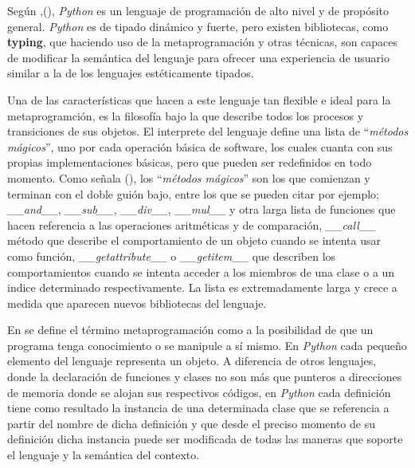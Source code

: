 Según ,(\cite{python}), {\it Python} es un lenguaje de programación de alto nivel y de propósito general.
    {\it Python} es de tipado dinámico y fuerte, pero existen bibliotecas, como {\bf typing}, que haciendo
uso de la metaprogramación y otras técnicas, son capaces de modificar la semántica del
lenguaje para ofrecer una experiencia de usuario similar a la de los lenguajes estéticamente
tipados.

Una de las características que hacen a este lenguaje tan flexible e ideal para la metaprogramción,
es la filosofía bajo la que describe todos los procesos y transiciones de sus objetos. El
interprete del lenguaje define una lista de ``{\it métodos mágicos}'', uno por cada operación básica
de software, los cuales cuanta con sus propias implementaciones básicas, pero que pueden ser
redefinidos en todo momento. Como señala (\cite{python}), los ``{\it métodos mágicos}'' son los que comienzan y
terminan con el doble guión bajo, entre los que se pueden citar por ejemplo;
{\it \_\_and\_\_}, {\it \_\_sub\_\_}, {\it \_\_div\_\_}, {\it \_\_mul\_\_} y otra larga lista de funciones que hacen referencia
a las operaciones aritméticas y de comparación, {\it\_\_call\_\_} método que describe el comportamiento
de un objeto cuando se intenta usar como función, {\it \_\_getattribute\_\_} o {\it \_\_getitem\_\_}
que describen los comportamientos cuando se intenta acceder a los miembros de una clase o a
un indice determinado respectivamente. La lista es extremadamente larga y crece a medida
que aparecen nuevos bibliotecas del lenguaje.

En \cite{python} se define el término metaprogramación como a la posibilidad de que un programa tenga
conocimiento o se manipule a sí mismo. En {\it Python} cada pequeño elemento del lenguaje
representa un objeto. A diferencia de otros lenguajes, donde la declaración de funciones y
clases no son más que punteros a direcciones de memoria donde se alojan sus respectivos códigos,
en {\it Python} cada definición tiene como resultado la instancia de una determinada clase que se
referencia a partir del nombre de dicha definición y que desde el preciso momento de su
definición dicha instancia puede ser modificada de todas las maneras que soporte el lenguaje
y la semántica del contexto.

